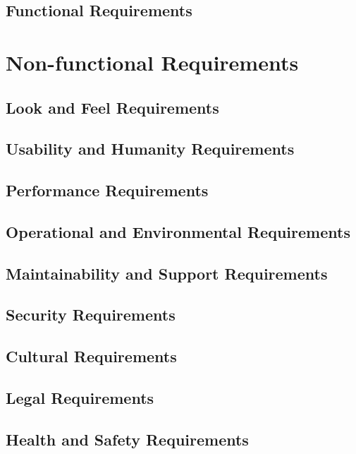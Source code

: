 \documentclass[12pt, titlepage]{article}
\begin{document}
\subsection{Functional Requirements}

\section{Non-functional Requirements}

\subsection{Look and Feel Requirements}

\subsection{Usability and Humanity Requirements}

\subsection{Performance Requirements}

\subsection{Operational and Environmental Requirements}

\subsection{Maintainability and Support Requirements}

\subsection{Security Requirements}

\subsection{Cultural Requirements}

\subsection{Legal Requirements}

\subsection{Health and Safety Requirements}
\end{document}
